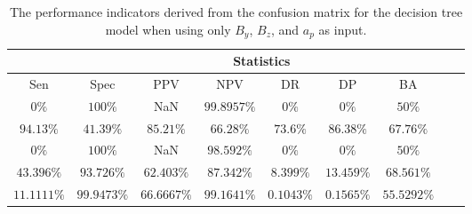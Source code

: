 \begin{table}[!ht]
	\centering
	\begin{tabular}{|c|c|c|c|c|c|c|c|c|}
		\hline
		 & \multicolumn{7}{c|}{Statistics} \\ \hline
		Sen & Spec & PPV & NPV & DR & DP & BA \\ \hline
		$0\%$ & $100\%$ & NaN & $99.8957\%$ & $0\%$ & $0\%$ & $50\%$ \\ \hline
		$94.13\%$ & $41.39\%$ & $85.21\%$ & $66.28\%$ & $73.6\%$ & $86.38\%$ & $67.76\%$ \\ \hline
		$0\%$ & $100\%$ & NaN & $98.592\%$ & $0\%$ & $0\%$ & $50\%$ \\ \hline
		$43.396\%$ & $93.726\%$ & $62.403\%$ & $87.342\%$ & $8.399\%$ & $13.459\%$ & $68.561\%$ \\ \hline
		$11.1111\%$ & $99.9473\%$ & $66.6667\%$ & $99.1641\%$ & $0.1043\%$ & $0.1565\%$ & $55.5292\%$ \\ \hline
	\end{tabular}
	\caption{The performance indicators derived from the confusion matrix for the decision tree model when using only $B_{y}$, $B_{z}$, and $a_{p}$ as input.}
	\label{tab:cs:yzap:C5.0}
\end{table}
